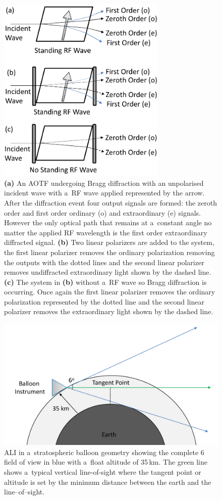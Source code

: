 \documentclass[amtd, online, hvmath]{copernicus}
\begin{document}
\begin{figure}
\includegraphics[height=90mm]{amt-2015-329-discussions-f02.pdf}
\caption{\textbf{(a)} An AOTF undergoing Bragg diffraction with an
  unpolarised incident wave with a~RF wave applied represented by the
  arrow. After the diffraction event four output signals are formed:
  the zeroth order and first order ordinary (o) and extraordinary (e)
  signals. However the only optical path that remains at a~constant
  angle no matter the applied RF wavelength is the first order
  extraordinary diffracted signal. \textbf{(b)} Two linear polarizers
  are added to the system, the first linear polarizer removes the
  ordinary polarization removing the outputs with the dotted lines and
  the second linear polarizer removes undiffracted extraordinary light
  shown by the dashed line. \textbf{(c)} The system in \textbf{(b)}
  without a~RF wave so Bragg diffraction is occurring. Once again the
  first linear polarizer removes the ordinary polarization represented
  by the dotted line and the second linear polarizer removes the
  extraordinary light shown by the dashed line.}
\label{amtd-2015-0329-f02.pdf}
\end{figure}

\begin{figure}
\includegraphics[width=120mm]{amt-2015-329-discussions-f03.pdf}
\caption{ALI in a~stratospheric balloon geometry showing the complete
  6{\degree} field of view in blue with a~float altitude of
  35\,\unit{km}. The green line shows a~typical vertical line-of-sight
  where the tangent point or altitude is set by the minimum distance
  between the earth and the line--of--sight.}
\label{amtd-2015-0329-f03.pdf}
\end{figure}
\end{document}
